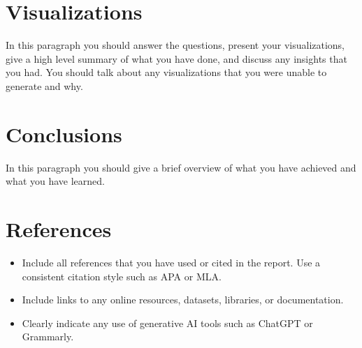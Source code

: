 \documentclass[11pt]{article}
\begin{document}
\section{Visualizations}

In this paragraph you should answer the questions, present your visualizations, give a high level summary of what you have done, and discuss any insights that you had. You should talk about any visualizations that you were unable to generate and why.

\section{Conclusions}

In this paragraph you should give a brief overview of what you have achieved and what you have learned.

\section{References}

\begin{itemize}
    \item Include all references that you have used or cited in the report. Use a consistent citation style such as APA or MLA.
    \item Include links to any online resources, datasets, libraries, or documentation.
    \item Clearly indicate any use of generative AI tools such as ChatGPT or Grammarly.
\end{itemize}











\printbibliography

\newpage

\begin{appendices}

\end{appendices}
\end{document}
